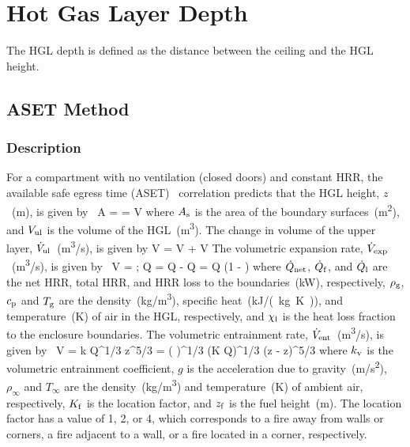 
\chapter{Hot Gas Layer Depth}
\label{HGL_Depth_Chapter}

The HGL depth is defined as the distance between the ceiling and the HGL height.

\section{ASET Method}
\label{sec:ASET}

\subsection*{Description}

For a compartment with no ventilation (closed doors) and constant HRR, the available safe egress time (ASET)~\cite{Walton:1}
correlation predicts that the HGL height, $z$~(\si{m}), is given by~\cite{SFPE:Milke}
\be
A  =  = \dot V
\label{eq:ASET_1}
\ee
where $A\sb{s}$ is the area of the boundary surfaces~(\si{m^2}), and $V\sb{ul}$ is the volume of the HGL~(\si{m^3}).
The change in volume of the upper layer, $\dot V\sb{ul}$~(\si{m^3/s}), is given by
\be
\dot V = \dot V + \dot V
\label{eq:ASET_2}
\ee
The volumetric expansion rate, $\dot V\sb{exp}$~(\si{m^3/s}), is given by~\cite{SFPE:Mowrer}
\be
\dot V =  \approx {} \quad ; \quad \dot Q = \dot Q - \dot Q = \dot Q  (1 - \dot \chi{})
\label{eq:ASET_3}
\ee
where $\dot Q\sb{net}$, $\dot Q\sb{f}$, and $\dot Q\sb{l}$ are the net HRR, total HRR, and HRR loss to the boundaries~(\si{kW}), respectively, $\rho\sb{g}$, $c\sb{p}$ and $T\sb{g}$ are the density~(\si{kg/m^3}), specific heat~(\si{kJ/(kg.K)}), and temperature~(\si{K}) of air in the HGL, respectively, and $\chi\sb{l}$ is the heat loss fraction to the enclosure boundaries.
The volumetric entrainment rate, $\dot V\sb{ent}$~(\si{m^3/s}), is given by~\cite{Zukoski:1981}
\be
\dot V = k \dot Q^{1/3} z^{5/3} =  \left(  \right)^{1/3} (K \dot Q)^{1/3} (z - z)^{5/3}
\label{eq:ASET_4}
\ee
where $k\sb{v}$ is the volumetric entrainment coefficient, $g$ is the acceleration due to gravity~(\si{m/s^2}), $\rho_\infty$ and $T_\infty$ are the density~(\si{kg/m^3}) and temperature~(\si{K}) of ambient air, respectively, $K\sb{f}$ is the location factor, and $z\sb{f}$ is the fuel height~(\si{m}). The location factor has a value of 1, 2, or 4, which corresponds to a fire away from walls or corners, a fire adjacent to a wall, or a fire located in a corner, respectively.

